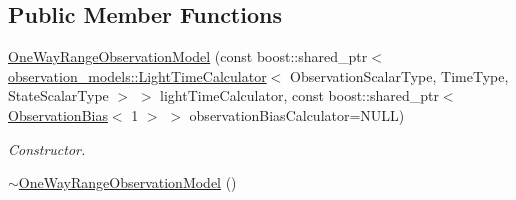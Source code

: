 \subsection*{Public Member Functions}
\begin{DoxyCompactItemize}
\item 
\hyperlink{classtudat_1_1observation__models_1_1OneWayRangeObservationModel_a250d02c750c666f8b2dc5622aeeb8dc5}{One\+Way\+Range\+Observation\+Model} (const boost\+::shared\+\_\+ptr$<$ \hyperlink{classtudat_1_1observation__models_1_1LightTimeCalculator}{observation\+\_\+models\+::\+Light\+Time\+Calculator}$<$ Observation\+Scalar\+Type, Time\+Type, State\+Scalar\+Type $>$ $>$ light\+Time\+Calculator, const boost\+::shared\+\_\+ptr$<$ \hyperlink{classtudat_1_1observation__models_1_1ObservationBias}{Observation\+Bias}$<$ 1 $>$ $>$ observation\+Bias\+Calculator=N\+U\+LL)
\begin{DoxyCompactList}\small\item\em Constructor. \end{DoxyCompactList}\item 
\hyperlink{classtudat_1_1observation__models_1_1OneWayRangeObservationModel_ab70b2fe05931a4c321fd11b2812e9f2b}{$\sim$\+One\+Way\+Range\+Observation\+Model} ()\hypertarget{classtudat_1_1observation__models_1_1OneWayRangeObservationModel_ab70b2fe05931a4c321fd11b2812e9f2b}{}\label{classtudat_1_1observation__models_1_1OneWayRangeObservationModel_ab70b2fe05931a4c321fd11b2812e9f2b}


\end{DoxyCompactItemize}
